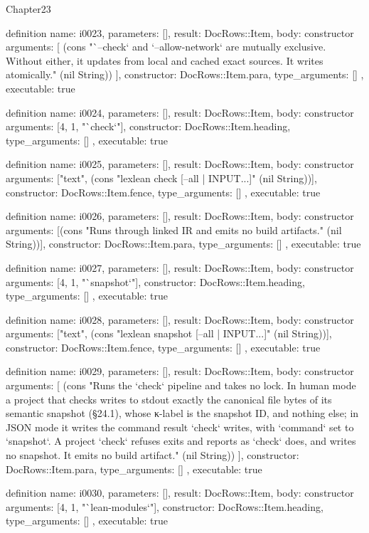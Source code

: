 \begin{lexlean}{Chapter23}
\begin{semanticmodule}
definition{
  name: i0023,
  parameters: [],
  result: DocRows::Item,
  body: constructor{
    arguments: [
      (cons "`--check` and `--allow-network` are mutually exclusive. Without either, it updates from local and cached exact sources. It writes atomically." (nil String))
    ],
    constructor: DocRows::Item.para,
    type_arguments: []
  },
  executable: true
}

definition{
  name: i0024,
  parameters: [],
  result: DocRows::Item,
  body: constructor{
    arguments: [4, 1, "`check`"],
    constructor: DocRows::Item.heading,
    type_arguments: []
  },
  executable: true
}

definition{
  name: i0025,
  parameters: [],
  result: DocRows::Item,
  body: constructor{
    arguments: ["text", (cons "lexlean check [--all | INPUT...]" (nil String))],
    constructor: DocRows::Item.fence,
    type_arguments: []
  },
  executable: true
}

definition{
  name: i0026,
  parameters: [],
  result: DocRows::Item,
  body: constructor{
    arguments: [(cons "Runs through linked IR and emits no build artifacts." (nil String))],
    constructor: DocRows::Item.para,
    type_arguments: []
  },
  executable: true
}

definition{
  name: i0027,
  parameters: [],
  result: DocRows::Item,
  body: constructor{
    arguments: [4, 1, "`snapshot`"],
    constructor: DocRows::Item.heading,
    type_arguments: []
  },
  executable: true
}

definition{
  name: i0028,
  parameters: [],
  result: DocRows::Item,
  body: constructor{
    arguments: ["text", (cons "lexlean snapshot [--all | INPUT...]" (nil String))],
    constructor: DocRows::Item.fence,
    type_arguments: []
  },
  executable: true
}

definition{
  name: i0029,
  parameters: [],
  result: DocRows::Item,
  body: constructor{
    arguments: [
      (cons "Runs the `check` pipeline and takes no lock. In human mode a project that checks writes to stdout exactly the canonical file bytes of its semantic snapshot (§24.1), whose κ-label is the snapshot ID, and nothing else; in JSON mode it writes the command result `check` writes, with `command` set to `snapshot`. A project `check` refuses exits and reports as `check` does, and writes no snapshot. It emits no build artifact." (nil String))
    ],
    constructor: DocRows::Item.para,
    type_arguments: []
  },
  executable: true
}

definition{
  name: i0030,
  parameters: [],
  result: DocRows::Item,
  body: constructor{
    arguments: [4, 1, "`lean-modules`"],
    constructor: DocRows::Item.heading,
    type_arguments: []
  },
  executable: true
}


\end{semanticmodule}
\end{lexlean}
